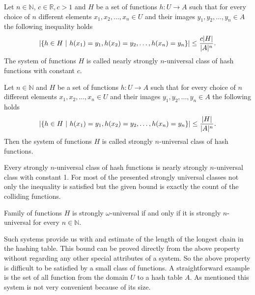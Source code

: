 \begin{definition}
\label{nearly_strong_universal_n_system}
Let $n \in \mathbb{N}$, $c \in \mathbb{R}, c > 1$ and $H$ be a set of functions $h: U \rightarrow A$ such that for every choice of $n$ different elements $x_1, x_2, \dots, x_n \in U$ and their images $y_1, y_2, \dots, y_n \in A$ the following inequality holds
\[ 
	\left|\lbrace h \in H \ | \  h(x_1) = y_1, h(x_2) = y_2, \dots, h(x_n) = y_n \rbrace \right| \leq \frac{c|H|}{|A|^n} \textit{.} 
\] 
The system of functions $H$ is called nearly strongly $n$-universal class of hash functions with constant $c$.
\end{definition}

\begin{definition}
\label{strong_universal_n_system}
Let $n \in \mathbb{N}$ and $H$ be a set of functions $h: U \rightarrow A$ such that for every choice of $n$ different elements $x_1, x_2, \dots, x_n \in U$ and their images $y_1, y_2, \dots, y_n \in A$ the following holds \[ \left|\lbrace h \in H \ | \  h(x_1) = y_1, h(x_2) = y_2, \dots, h(x_n) = y_n \rbrace \right| \leq \frac{|H|}{|A|^n} \textit{.} \] Then the system of functions $H$ is called strongly $n$-universal class of hash functions.
\end{definition}

Every strongly $n$-universal class of hash functions is nearly strongly $n$-universal class with constant 1. For most of the presented strongly universal classes not only the inequality is satisfied but the given bound is exactly the count of the colliding functions.

\begin{definition}
\label{strong_universal_omega_system}
Family of functions $H$ is strongly $\omega$-universal if and only if it is strongly $n$-universal for every $n \in \mathbb{N}$.
\end{definition}

Such systems provide us with and estimate of the length of the longest chain in the hashing table. This bound can be proved directly from the above property without regarding any other special attributes of a system. So the above property is difficult to be satisfied by a small class of functions. A straightforward example is the set of all function from the domain $U$ to a hash table $A$. As mentioned this system is not very convenient because of its size.


